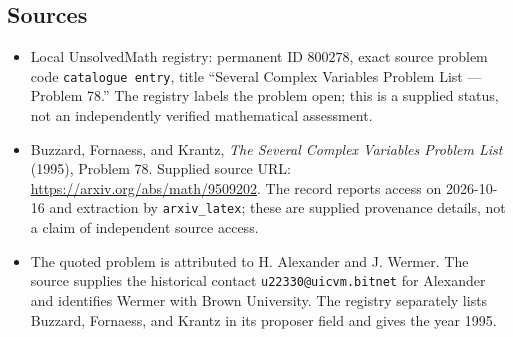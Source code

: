 \documentclass[11pt]{article}
\begin{document}
\subsection{Sources}
\begin{itemize}
\item Local UnsolvedMath registry: permanent ID \(800278\), exact source problem code \texttt{catalogue entry}, title ``Several Complex Variables Problem List --- Problem 78.'' The registry labels the problem open; this is a supplied status, not an independently verified mathematical assessment.
\item Buzzard, Fornaess, and Krantz, \emph{The Several Complex Variables Problem List} (1995), Problem 78. Supplied source URL: \url{https://arxiv.org/abs/math/9509202}. The record reports access on 2026-10-16 and extraction by \texttt{arxiv\_latex}; these are supplied provenance details, not a claim of independent source access.
\item The quoted problem is attributed to H. Alexander and J. Wermer. The source supplies the historical contact \texttt{u22330@uicvm.bitnet} for Alexander and identifies Wermer with Brown University. The registry separately lists Buzzard, Fornaess, and Krantz in its proposer field and gives the year 1995.
\end{itemize}
\end{document}
